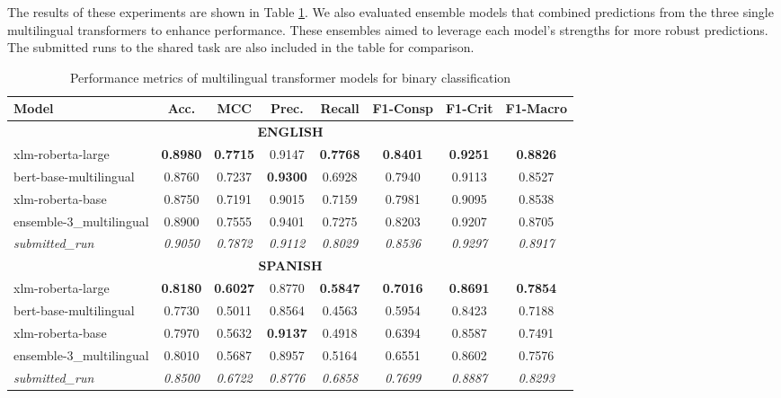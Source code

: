 \documentclass{Configuration_Files/PoliMi3i_thesis}
\begin{document}
The results of these experiments are shown in Table \ref{tab:performance_T1_multilingual}. We also evaluated ensemble models that combined predictions from the three single multilingual transformers to enhance performance. These ensembles aimed to leverage each model's strengths for more robust predictions. The submitted runs to the shared task are also included in the table for comparison.

\begin{table}[H]
\centering
\footnotesize
\begin{tabular}{lccccccc}
\hline \textbf{Model} & \textbf{Acc.} & \textbf{MCC} & \textbf{Prec.} & \textbf{Recall} & \textbf{F1-Consp} & \textbf{F1-Crit} & \textbf{F1-Macro} \\
\hline
\multicolumn{8}{c}{\textbf{ENGLISH}} \\
\hline
xlm-roberta-large & \textbf{0.8980} & \textbf{0.7715} & 0.9147 & \textbf{0.7768} & \textbf{0.8401} & \textbf{0.9251} & \textbf{0.8826} \\
bert-base-multilingual & 0.8760 & 0.7237 & \textbf{0.9300} & 0.6928 & 0.7940 & 0.9113 & 0.8527 \\
xlm-roberta-base & 0.8750 & 0.7191 & 0.9015 & 0.7159 & 0.7981 & 0.9095 & 0.8538 \\
ensemble-3\_multilingual & 0.8900 & 0.7555 & 0.9401 & 0.7275 & 0.8203 & 0.9207 & 0.8705 \\
\hline
\textit{submitted\_run} & \textit{0.9050} & \textit{0.7872} & \textit{0.9112} & \textit{0.8029} & \textit{0.8536} & \textit{0.9297} & \textit{0.8917} \\
\hline
\multicolumn{8}{c}{\textbf{SPANISH}} \\
\hline
xlm-roberta-large & \textbf{0.8180} & \textbf{0.6027} & 0.8770 & \textbf{0.5847} & \textbf{0.7016} & \textbf{0.8691} & \textbf{0.7854} \\
bert-base-multilingual & 0.7730 & 0.5011 & 0.8564 & 0.4563 & 0.5954 & 0.8423 & 0.7188 \\
xlm-roberta-base & 0.7970 & 0.5632 & \textbf{0.9137} & 0.4918 & 0.6394 & 0.8587 & 0.7491 \\
ensemble-3\_multilingual & 0.8010 & 0.5687 & 0.8957 & 0.5164 & 0.6551 & 0.8602 & 0.7576 \\
\hline
\textit{submitted\_run} & \textit{0.8500} & \textit{0.6722} & \textit{0.8776} & \textit{0.6858} & \textit{0.7699} & \textit{0.8887} & \textit{0.8293} \\
\hline
\end{tabular}
\caption{Performance metrics of multilingual transformer models for binary classification}
\label{tab:performance_T1_multilingual}
\end{table}
\FloatBarrier
\end{document}
